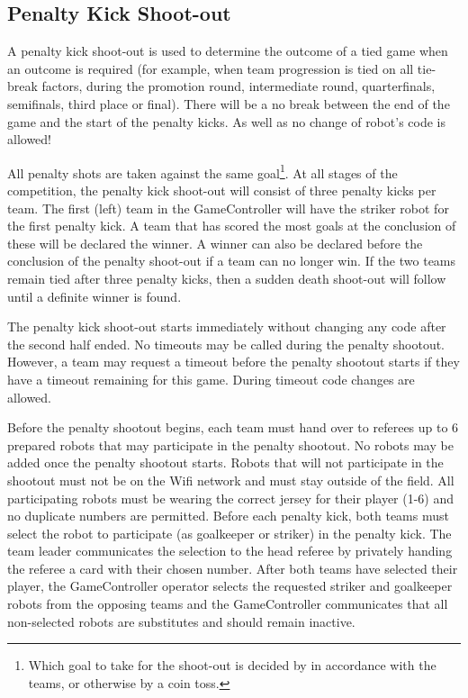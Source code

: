 \subsection{Penalty Kick Shoot-out}
\label{sec:penalty_shoot-out}

A penalty kick shoot-out is used to determine the outcome of a tied game when an outcome is required (for example, when team progression is tied on all tie-break factors, during the promotion round, intermediate round, quarterfinals, semifinals, third place or final).
There will be a no break between the end of the game and the start of the penalty kicks. As well as no change of robot's code is allowed!

All penalty shots are taken against the same goal\footnote{Which goal to take for the shoot-out is decided by in accordance with the teams, or otherwise by a coin toss.}.
At all stages of the competition, the penalty kick shoot-out will consist of three penalty kicks per team.
The first (left) team in the GameController will have the striker robot for the first penalty kick.
A team that has scored the most goals at the conclusion of these will be declared the winner. A winner can also be declared before the conclusion of the penalty shoot-out if a team can no longer win. If the two teams remain tied after three penalty kicks, then a sudden death shoot-out will follow until a definite winner is found.

The penalty kick shoot-out starts immediately without changing any code after the second half ended. No timeouts may be called during the penalty shootout. However, a team may request a timeout before the penalty shootout starts if they have a timeout remaining for this game. During timeout code changes are allowed.

Before the penalty shootout begins, each team must hand over to referees up to 6 prepared robots that may participate in the penalty shootout. No robots may be added once the penalty shootout starts. Robots that will not participate in the shootout must not be on the Wifi network and must stay outside of the field. All participating robots must be wearing the correct jersey for their player (1-6) and no duplicate numbers are permitted. Before each penalty kick, both teams must select the robot to participate (as goalkeeper or striker) in the penalty kick. The team leader communicates the selection to the head referee by privately handing the referee a card with their chosen number. After both teams have selected their player, the GameController operator selects the requested striker and goalkeeper robots from the opposing teams and the GameController communicates that all non-selected robots are substitutes and should remain inactive.

